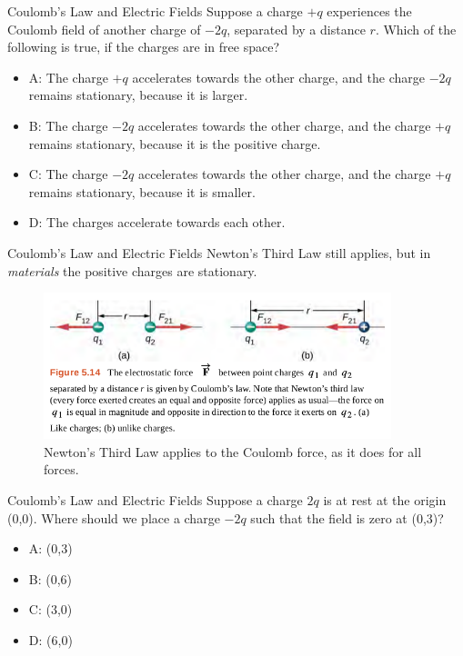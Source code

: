 \documentclass{beamer}
\begin{document}
\begin{frame}{Coulomb’s Law and Electric Fields}
Suppose a charge $+q$ experiences the Coulomb field of another charge of $-2q$, separated by a distance $r$.  Which of the following is true, if the charges are in free space?
\begin{itemize}
\item A: The charge $+q$ accelerates towards the other charge, and the charge $-2q$ remains stationary, because it is larger.
\item B: The charge $-2q$ accelerates towards the other charge, and the charge $+q$ remains stationary, because it is the positive charge.
\item C: The charge $-2q$ accelerates towards the other charge, and the charge $+q$ remains stationary, because it is smaller.
\item D: The charges accelerate towards each other.
\end{itemize}
\end{frame}

\begin{frame}{Coulomb’s Law and Electric Fields}
Newton's Third Law still applies, but in \textit{materials} the positive charges are stationary.
\begin{figure}
\centering
\includegraphics[width=0.9\textwidth]{figures/third.png}
\caption{\label{fig:third} Newton's Third Law applies to the Coulomb force, as it does for all forces.}
\end{figure}
\end{frame}

\begin{frame}{Coulomb’s Law and Electric Fields}
Suppose a charge $2q$ is at rest at the origin (0,0).  Where should we place a charge $-2q$ such that the field is zero at (0,3)?
\begin{itemize}
\item A: (0,3)
\item B: (0,6)
\item C: (3,0)
\item D: (6,0)
\end{itemize}
\end{frame}
\end{document}
